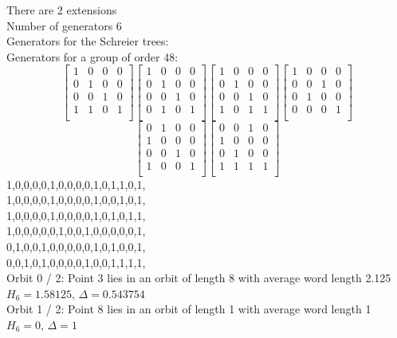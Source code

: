 There are 2 extensions\\
Number of generators 6\\
Generators for the Schreier trees:\\
{\small\arraycolsep=2pt
Generators for a group of order 48:
$$
\left[
\begin{array}{*{4}{r}}
1 & 0 & 0 & 0\\
0 & 1 & 0 & 0\\
0 & 0 & 1 & 0\\
1 & 1 & 0 & 1\\
\end{array}
\right]
\left[
\begin{array}{*{4}{r}}
1 & 0 & 0 & 0\\
0 & 1 & 0 & 0\\
0 & 0 & 1 & 0\\
0 & 1 & 0 & 1\\
\end{array}
\right]
\left[
\begin{array}{*{4}{r}}
1 & 0 & 0 & 0\\
0 & 1 & 0 & 0\\
0 & 0 & 1 & 0\\
1 & 0 & 1 & 1\\
\end{array}
\right]
\left[
\begin{array}{*{4}{r}}
1 & 0 & 0 & 0\\
0 & 0 & 1 & 0\\
0 & 1 & 0 & 0\\
0 & 0 & 0 & 1\\
\end{array}
\right]
$$
$$
\left[
\begin{array}{*{4}{r}}
0 & 1 & 0 & 0\\
1 & 0 & 0 & 0\\
0 & 0 & 1 & 0\\
1 & 0 & 0 & 1\\
\end{array}
\right]
\left[
\begin{array}{*{4}{r}}
0 & 0 & 1 & 0\\
1 & 0 & 0 & 0\\
0 & 1 & 0 & 0\\
1 & 1 & 1 & 1\\
\end{array}
\right]
$$
1,0,0,0,0,1,0,0,0,0,1,0,1,1,0,1,\\
1,0,0,0,0,1,0,0,0,0,1,0,0,1,0,1,\\
1,0,0,0,0,1,0,0,0,0,1,0,1,0,1,1,\\
1,0,0,0,0,0,1,0,0,1,0,0,0,0,0,1,\\
0,1,0,0,1,0,0,0,0,0,1,0,1,0,0,1,\\
0,0,1,0,1,0,0,0,0,1,0,0,1,1,1,1,\\
}
\noindent Orbit 0 / 2: Point 3 lies in an orbit of length 8 with average word length 2.125 $H_{6} = 1.58125$, $\Delta = 0.543754$\\
\noindent Orbit 1 / 2: Point 8 lies in an orbit of length 1 with average word length 1 $H_{6} = 0$, $\Delta = 1$\\
